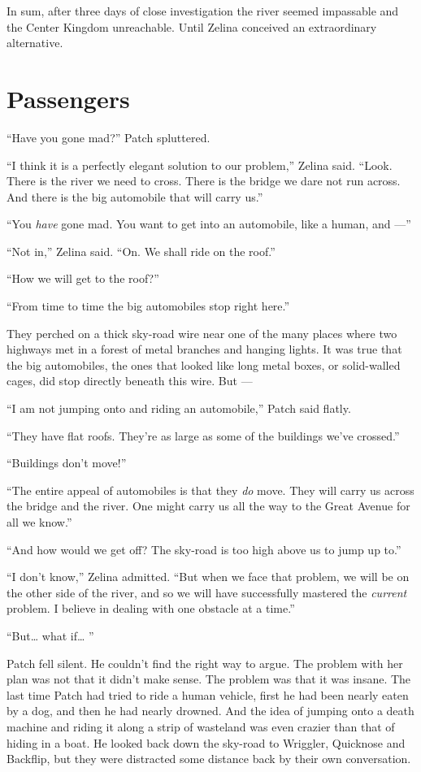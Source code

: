 \documentclass[ebook,oneside,openany,12pt]{memoir}
\begin{document}
In sum, after three days of close investigation the river seemed
impassable and the Center Kingdom unreachable. Until Zelina conceived
an extraordinary alternative.


\section{Passengers}

“Have you gone mad?” Patch spluttered.

“I think it is a perfectly elegant solution to our problem,” Zelina
said. “Look. There is the river we need to cross. There is the bridge
we dare not run across. And there is the big automobile that will
carry us.”

“You \emph{have} gone mad. You want to get into an automobile, like
a human, and —”

“Not in,” Zelina said. “On. We shall ride on the roof.”

“How we will get to the roof?”

“From time to time the big automobiles stop right here.”

They perched on a thick sky-road wire near one of the many places
where two highways met in a forest of metal branches and hanging
lights. It was true that the big automobiles, the ones that looked
like long metal boxes, or solid-walled cages, did stop directly
beneath this wire. But —

“I am not jumping onto and riding an automobile,” Patch said flatly.

“They have flat roofs. They’re as large as some of the buildings we’ve
crossed.”

“Buildings don’t move!”

“The entire appeal of automobiles is that they \emph{do} move. They
will carry us across the bridge and the river. One might carry us all
the way to the Great Avenue for all we know.”

“And how would we get off? The sky-road is too high above us to jump
up to.”

“I don’t know,” Zelina admitted. “But when we face that problem, we
will be on the other side of the river, and so we will have
successfully mastered the \emph{current} problem. I believe in
dealing with one obstacle at a time.”

“But… what if… ”

Patch fell silent. He couldn’t find the right way to argue. The
problem with her plan was not that it didn’t make sense. The problem
was that it was insane. The last time Patch had tried to ride a human
vehicle, first he had been nearly eaten by a dog, and then he had
nearly drowned. And the idea of jumping onto a death machine and
riding it along a strip of wasteland was even crazier than that of
hiding in a boat. He looked back down the sky-road to Wriggler,
Quicknose and Backflip, but they were distracted some distance back by
their own conversation.
\end{document}

